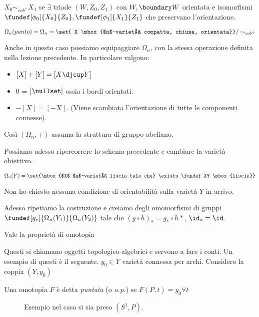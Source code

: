 \begin{defn}
 $X_0\sim_{cob^+}X_1$ se $\exists$ triade $(W, Z_0, Z_1)$ con $W, \boundary W$ orientata e isomorfismi $\fundef[\phi_0]{X_0}{Z_0}, \fundef[\phi_1]{X_1}{Z_1}$
 che preservano l'orientazione.
\end{defn}
\begin{defn}
 $\Omega _n(punto)=\Omega _n = \set{ X \mbox{$n$-varietà compatta, chiusa, orientata}} /\sim_{cob^+}$
\end{defn}

\begin{oss}
 Anche in questo caso possiamo equipaggiare $\Omega _n$, con la stessa operazione definita nella lezione precedente.
 In particolare valgono:
 \begin{itemize}
  \item $\left [ X \right ] + \left [ Y \right ] = \left [ X \djcup Y \right ]$
  \item 0 = $\left [ \nullset \right ]$ ossia i bordi orientati.
  \item $-\left[ X\right]=\left[-X\right]$. (Viene scambiata l'orientazione di tutte le componenti connesse).
 \end{itemize}
 Così $(\Omega _n, +)$ assuma la struttura di gruppo abeliano.
\end{oss}
Possiamo adesso ripercorrere lo schema precedente e cambiare la varietà obiettivo.
\begin{defn}
 $\Omega_n (Y) = \set{\mbox{$X$ $n$-varietà liscia tale che} \exists \fundef XY \mbox{liscia}}$
\end{defn}
\begin{oss}
 Non ho chiesto nessuna condizione di orientabilità sulla varietà $Y$ in arrivo.
\end{oss}
Adesso ripetiamo la costruzione e creiamo degli omomorfismi di gruppi $\fundef[g_*]{\Omega _n (Y_1)}{\Omega _n(Y_2)}$ tale che $(g\circ h )_* = g_*\circ h*$,
 $\id_* = \id$.
\begin{teo}
 Vale la proprietà di omotopia
\end{teo}
Questi si chiamano oggetti topologico-algebrici e servono a fare i conti. Un esempio di questi è il seguente.
$y_0\in Y$ varietà connessa per archi. Considero la coppia $(Y, y_0)$
\begin{defn}
Una omotopia $F$ è detta \emph{puntata} (o \emph{o.p.}) se $F(P, t) = y_0 \forall t$
 \begin{figure}
  \centering
  
  \caption{Esempio nel caso si sia preso $(S^1, P).$}
 \end{figure}

\end{defn}
